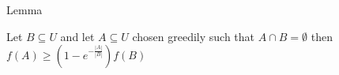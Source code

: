 \begin{frame}{Lemma}
    \begin{Lemma}
        Let $B \subseteq U$ and let $A \subseteq U$ chosen greedily such that $A \cap B = \emptyset$ then $f(A) \geq (1 - e^{-\frac{|A|}{|B|}})f(B)$
    \end{Lemma}
\end{frame}